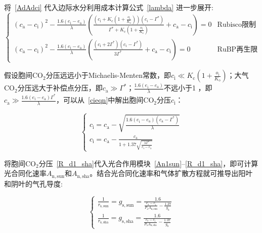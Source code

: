 将~\eqref{AdAdci} 代入边际水分利用成本计算公式~\eqref{lambda} 进一步展开:
\begin{equation}\label{cieqn}
\begin{cases}
    \left(c_{\mathrm{a}}-c_{\mathrm{i}}\right)^2-\frac{1.6\left(e_{\mathrm{i}}-e_{\mathrm{a}}\right)}{\lambda}\left(\frac{\left(c_{\mathrm{i}}+K_{\mathrm{c}}\left(1+\frac{o_{\mathrm{i}}}{K_{\mathrm{o}}}\right)\right)\left(c_i-\Gamma^*\right)}{\Gamma^*+K_{\mathrm{c}}\left(1+\frac{o_{\mathrm{i}}}{K_{\mathrm{o}}}\right)}+c_{\mathrm{a}}-c_{\mathrm{i}}\right)=0 & \text{Rubisco限制}  \\
    \left(c_{\mathrm{a}}-c_{\mathrm{i}}\right)^2-\frac{1.6\left(e_{\mathrm{i}}-e_{\mathrm{a}}\right)}{\lambda}\left(\frac{\left(c_{\mathrm{i}}+2\Gamma^*\right)\left(c_i-\Gamma^*\right)}{3\Gamma^*}+c_{\mathrm{a}}-c_{\mathrm{i}}\right)=0  & \text{RuBP再生限制}
\end{cases}
\end{equation}

假设胞间$\mathrm {CO_2}$分压远远小于Michaelis-Menten常数，即$c_{\mathrm{i}}\ll K_{\mathrm{c}}\left(1+\frac{o_{\mathrm{i}}}{K_{\mathrm{o}}}\right)$；大气$\mathrm {CO_2}$分压远大于补偿点分压，即$c_{\mathrm{a}}\gg\Gamma^*$；$\frac{1.6\left(e_{\mathrm{i}}-e_{\mathrm{a}}\right)}{\lambda}$不远小于1 ，即$c_{\mathrm{a}}\gg\frac{1.6\left(e_{\mathrm{i}}-e_{\mathrm{a}}\right)\Gamma^*}{\lambda}$，可以从~\eqref{cieqn}中解出胞间$\mathrm {CO_2}$分压$c_{\mathrm{i}}$：

\begin{equation}\label{cisolu}
    \begin{cases}
    c_{\mathrm{i}}=c_{\mathrm{a}} - \sqrt{\frac{1.6\left(e_{\mathrm{i}}-e_{\mathrm{a}}\right)\left(c_{\mathrm{a}}-\Gamma^*\right)}{\lambda}} \\
    c_{\mathrm{i}}=c_{\mathrm{a}} - \frac{c_{\mathrm{a}}}{1+1.37\sqrt{\frac{\lambda \Gamma^*}{e_{\mathrm{i}}-e_{\mathrm{a}}}}}
    \end{cases}
\end{equation}

将胞间$\mathrm {CO_2}$分压~\eqref{R_d1_sha}代入光合作用模块~\eqref{An1sun}--\eqref{R_d1_sha}，即可计算光合同化速率$A_{\mathrm{n,sun}}$和$A_{\mathrm{n,sha}}$。结合光合同化速率和气体扩散方程就可推导出阳叶和阴叶的气孔导度:

\begin{equation}\label{gssolu}
    \begin{cases}
    \frac{1}{r_{\mathrm{s,sun}}}=g_{\mathrm{s,sun}}=\frac{1.6} {\frac{c_{\mathrm{a}}-c_{\mathrm{i}}}{P_{\mathrm {a}} A_{\mathrm{n,sun}}} - \frac{1.37}{g_{\mathrm{b}}}}\\
    \frac{1}{r_{\mathrm{s,sha}}}=g_{\mathrm{s,sha}}=\frac{1.6} {\frac{c_{\mathrm{a}}-c_{\mathrm{i}}}{P_{\mathrm {a}} A_{\mathrm{n,sha}}} - \frac{1.37}{g_{\mathrm{b}}}}
    \end{cases}
\end{equation}


